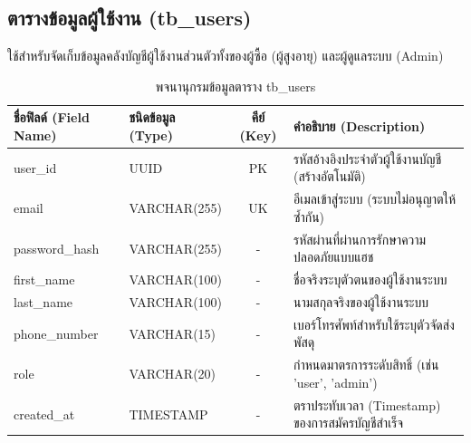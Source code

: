 \subsection{ตารางข้อมูลผู้ใช้งาน (tb\_users)}
ใช้สำหรับจัดเก็บข้อมูลคลังบัญชีผู้ใช้งานส่วนตัวทั้งของผู้ซื้อ (ผู้สูงอายุ) และผู้ดูแลระบบ (Admin)
\begin{table}[h!]
\centering
\caption{พจนานุกรมข้อมูลตาราง tb\_users}
\vspace{0.2cm}
\begin{tabular}{|l|l|c|l|}
\hline
\textbf{ชื่อฟิลด์ (Field Name)} & \textbf{ชนิดข้อมูล (Type)} & \textbf{คีย์ (Key)} & \textbf{คำอธิบาย (Description)} \\ \hline
user\_id & UUID & PK & รหัสอ้างอิงประจำตัวผู้ใช้งานบัญชี (สร้างอัตโนมัติ) \\ \hline
email & VARCHAR(255) & UK & อีเมลเข้าสู่ระบบ (ระบบไม่อนุญาตให้ซ้ำกัน) \\ \hline
password\_hash & VARCHAR(255) & - & รหัสผ่านที่ผ่านการรักษาความปลอดภัยแบบแฮช \\ \hline
first\_name & VARCHAR(100) & - & ชื่อจริงระบุตัวตนของผู้ใช้งานระบบ \\ \hline
last\_name & VARCHAR(100) & - & นามสกุลจริงของผู้ใช้งานระบบ \\ \hline
phone\_number & VARCHAR(15) & - & เบอร์โทรศัพท์สำหรับใช้ระบุตัวจัดส่งพัสดุ \\ \hline
role & VARCHAR(20) & - & กำหนดมาตรการระดับสิทธิ์ (เช่น 'user', 'admin') \\ \hline
created\_at & TIMESTAMP & - & ตราประทับเวลา (Timestamp) ของการสมัครบัญชีสำเร็จ \\ \hline
\end{tabular}
\end{table}


